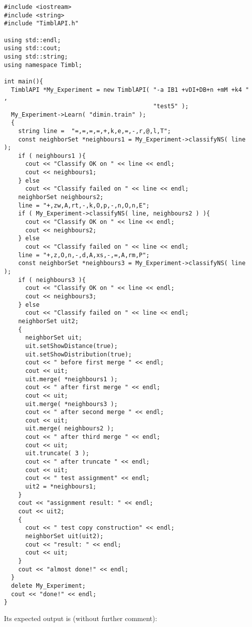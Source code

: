 \documentclass{report}
\begin{document}
\begin{footnotesize}
\begin{verbatim}
#include <iostream>
#include <string>
#include "TimblAPI.h"

using std::endl;
using std::cout;
using std::string;
using namespace Timbl;

int main(){
  TimblAPI *My_Experiment = new TimblAPI( "-a IB1 +vDI+DB+n +mM +k4 " , 
                                          "test5" );
  My_Experiment->Learn( "dimin.train" );  
  {
    string line =  "=,=,=,=,+,k,e,=,-,r,@,l,T";
    const neighborSet *neighbours1 = My_Experiment->classifyNS( line );
    if ( neighbours1 ){
      cout << "Classify OK on " << line << endl;
      cout << neighbours1;
    } else
      cout << "Classify failed on " << line << endl;
    neighborSet neighbours2;
    line = "+,zw,A,rt,-,k,O,p,-,n,O,n,E";
    if ( My_Experiment->classifyNS( line, neighbours2 ) ){
      cout << "Classify OK on " << line << endl;
      cout << neighbours2;
    } else
      cout << "Classify failed on " << line << endl;
    line = "+,z,O,n,-,d,A,xs,-,=,A,rm,P";
    const neighborSet *neighbours3 = My_Experiment->classifyNS( line );
    if ( neighbours3 ){
      cout << "Classify OK on " << line << endl;
      cout << neighbours3;
    } else
      cout << "Classify failed on " << line << endl;
    neighborSet uit2;
    {
      neighborSet uit;
      uit.setShowDistance(true);
      uit.setShowDistribution(true);
      cout << " before first merge " << endl;
      cout << uit;
      uit.merge( *neighbours1 );
      cout << " after first merge " << endl;
      cout << uit;
      uit.merge( *neighbours3 );
      cout << " after second merge " << endl;
      cout << uit;
      uit.merge( neighbours2 );
      cout << " after third merge " << endl;
      cout << uit;
      uit.truncate( 3 );
      cout << " after truncate " << endl;
      cout << uit;
      cout << " test assignment" << endl;
      uit2 = *neighbours1;
    }
    cout << "assignment result: " << endl;
    cout << uit2;
    {
      cout << " test copy construction" << endl;
      neighborSet uit(uit2);
      cout << "result: " << endl;
      cout << uit;
    }
    cout << "almost done!" << endl;
  }
  delete My_Experiment;
  cout << "done!" << endl;
}
\end{verbatim}
\end{footnotesize}

Its expected output is (without further comment):
\end{document}
